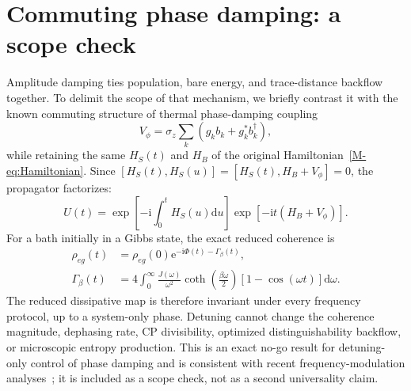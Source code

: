 \documentclass[reprint,superscriptaddress,floatfix,amsmath,amssymb,prresearch,aps]{revtex4-2}
\newcommand{\dd}{\mathrm{d}}
\newcommand{\ee}{\mathrm{e}}
\newcommand{\ii}{\mathrm{i}}
\begin{document}
\section{Commuting phase damping: a scope check}
\label{sec:phasedamping}

Amplitude damping ties population, bare energy, and trace-distance backflow
together. To delimit the scope of that mechanism, we briefly contrast it
with the known commuting structure of thermal
phase-damping coupling
\begin{equation}
V_\phi=\sigma_z\sum_k(g_kb_k+g_k^*b_k^\dagger),
\label{eq:phasedampinginteraction}
\end{equation}
while retaining the same \(H_S(t)\) and \(H_B\) of the original Hamiltonian~\eqref{M-eq:Hamiltonian}. Since
\([H_S(t),H_S(u)]=[H_S(t),H_B+V_\phi]=0\), the propagator factorizes:
\begin{equation}
U(t)=\exp\left[-\ii\int_0^tH_S(u)\dd u\right]
\exp[-\ii t(H_B+V_\phi)].
\label{eq:phasedampingfactorization}
\end{equation}
For a bath initially in a Gibbs state, the exact reduced coherence is
\begin{align}
\rho_{eg}(t)&=\rho_{eg}(0)\ee^{-\ii\Phi(t)-\Gamma_\beta(t)},
\label{eq:phasecoherence}\\
\Gamma_\beta(t)&=4\int_0^\infty\frac{J(\omega)}{\omega^2}
\coth\left(\frac{\beta\omega}{2}\right)
[1-\cos(\omega t)]\dd\omega.
\label{eq:phaseGamma}
\end{align}
The reduced dissipative map is therefore invariant under every frequency
protocol, up to a system-only phase. Detuning cannot change the coherence
magnitude, dephasing rate, CP divisibility, optimized distinguishability
backflow, or microscopic entropy production. This is an exact no-go result
for detuning-only control of phase damping and is consistent with recent
frequency-modulation analyses~\cite{Khazaei2026}; it is included as a scope
check, not as a second universality claim.
\end{document}
